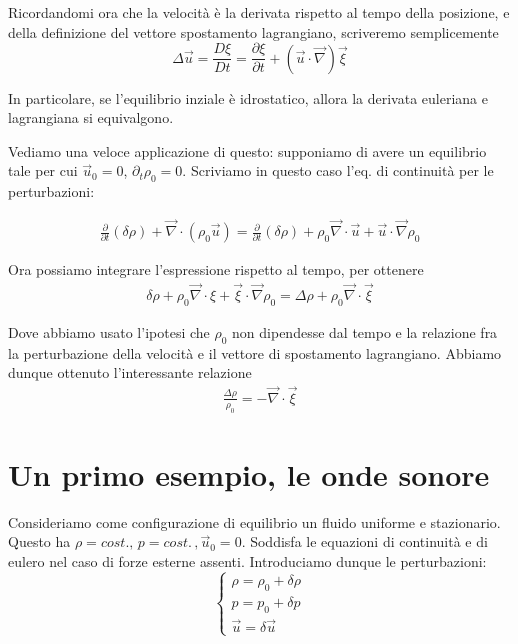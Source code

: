 \documentclass{report}
\begin{document}
Ricordandomi ora che la velocità è la derivata rispetto al tempo della posizione, e della definizione del vettore spostamento lagrangiano, scriveremo semplicemente 
\begin{equation}
    \Delta \vec{u} = \frac{D\xi}{Dt} = \frac{\partial \xi}{\partial t} + (\vec{u}\cdot \vec{\nabla})\vec{\xi}
\end{equation}

In particolare, se l'equilibrio inziale è idrostatico, allora la derivata euleriana e lagrangiana si equivalgono. 

Vediamo una veloce applicazione di questo: supponiamo di avere un equilibrio tale per cui $\vec{u}_0 = 0$, $\partial_t \rho_0 = 0$. Scriviamo in questo caso l'eq. di continuità per le perturbazioni: 

\begin{align}
    \frac{\partial}{\partial t}(\delta \rho) + \vec{\nabla}\cdot (\rho_0\vec{u}) = \frac{\partial}{\partial t}(\delta \rho) + \rho_0\vec{\nabla}\cdot\vec{u} + \vec{u}\cdot \vec{\nabla}\rho_0 
\end{align}

Ora possiamo integrare l'espressione rispetto al tempo, per ottenere
\begin{align}
    \delta \rho + \rho_0 \vec{\nabla}\cdot \xi + \vec{\xi}\cdot \vec{\nabla}\rho_0 = \Delta\rho + \rho_0 \vec{\nabla}\cdot \vec{\xi}
\end{align}

Dove abbiamo usato l'ipotesi che $\rho_0$ non dipendesse dal tempo e la relazione fra la perturbazione della velocità e il vettore di spostamento lagrangiano. Abbiamo dunque ottenuto l'interessante relazione
\begin{align}
    \frac{\Delta \rho}{\rho_0} = - \vec{\nabla}\cdot \vec{\xi}
\end{align}
\section{Un primo esempio, le onde sonore}

Consideriamo come configurazione di equilibrio un fluido uniforme e stazionario. Questo ha $\rho = cost. , \, p= cost.\,, \vec{u}_0=0$. Soddisfa le equazioni di continuità e di eulero nel caso di forze esterne assenti. Introduciamo dunque le perturbazioni: 
\[\begin{cases}
    \rho = \rho_0 + \delta\rho \\ p = p_0 + \delta p \\ \vec{u} = \delta \vec{u}
\end{cases}\]
\end{document}
